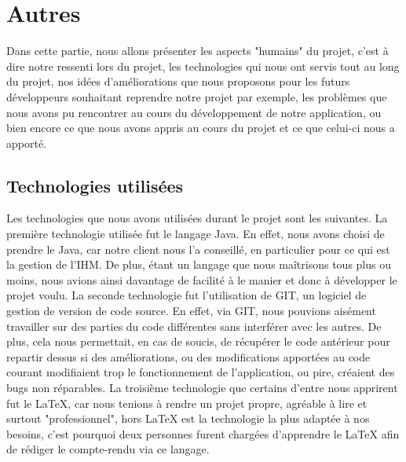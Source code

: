 \section{Autres}
	
	Dans cette partie, nous allons présenter les aspects "humains" du projet, c'est à dire notre ressenti lors du projet, les technologies qui nous ont servis tout au long du projet, nos idées d'améliorations que nous proposons pour les futurs développeurs souhaitant reprendre notre projet par exemple, les problèmes que nous avons pu rencontrer au cours du développement de notre application, ou bien encore ce que nous avons appris au cours du projet et ce que celui-ci nous a apporté.

\subsection{Technologies utilisées}
	Les technologies que nous avons utilisées durant le projet sont les suivantes.\newline
	La première technologie utilisée fut le langage Java. En effet, nous avons choisi de prendre le Java, car notre client nous l'a conseillé, en particulier pour ce qui est la gestion de l'IHM. De plus, étant un langage que nous maîtrisons tous plus ou moins, nous avions ainsi davantage de facilité à le manier et donc à développer le projet voulu.\newline
	La seconde technologie fut l'utilisation de GIT, un logiciel de gestion de version de code source. En effet, via GIT, nous pouvions aisément travailler sur des parties du code différentes sans interférer avec les autres. De plus, cela nous permettait, en cas de soucis, de récupérer le code antérieur pour repartir dessus si des améliorations, ou des modifications apportées au code courant modifiaient trop le fonctionnement de l'application, ou pire, créaient des bugs non réparables.\newline
	La troisième technologie que certains d'entre nous apprirent fut le \LaTeX{}, car nous tenions à rendre un projet propre, agréable à lire et surtout "professionnel", hors \LaTeX{} est la technologie la plus adaptée à nos besoins, c'est pourquoi deux personnes furent chargées d'apprendre le \LaTeX{} afin de rédiger le compte-rendu via ce langage.

